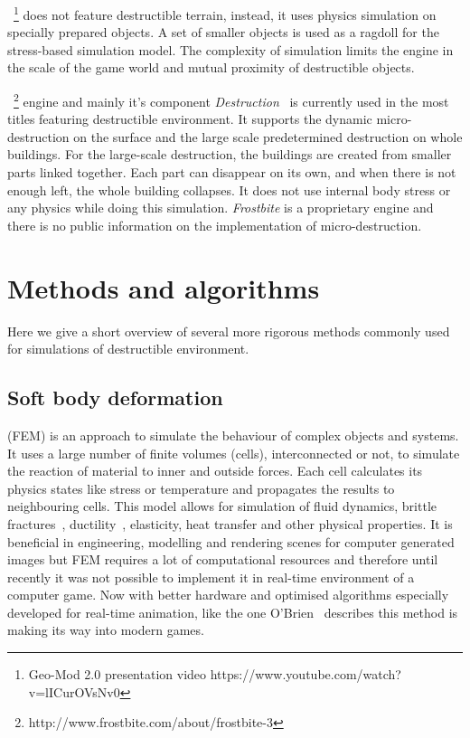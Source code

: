 ~\cite{geomod}\footnote{Geo-Mod 2.0 presentation video https://www.youtube.com/watch?v=lICurOVsNv0} does not feature destructible terrain, instead, it uses physics simulation on specially prepared objects. A set of smaller objects is used as a ragdoll for the stress-based simulation model. The complexity of simulation limits the engine in the scale of the game world and mutual proximity of destructible objects.


~\footnote{http://www.frostbite.com/about/frostbite-3} engine and mainly it's component \emph{Destruction}~\cite{destruction} is currently used in the most titles featuring destructible environment. It supports the dynamic micro-destruction on the surface and the large scale predetermined destruction on whole buildings. For the large-scale destruction, the buildings are created from smaller parts linked together. Each part can disappear on its own, and when there is not enough left, the whole building collapses. It does not use internal body stress or any physics while doing this simulation. \emph{Frostbite} is a proprietary engine and there is no public information on the implementation of micro-destruction.

\section{Methods and algorithms}

Here we give a short overview of several more rigorous methods commonly used for simulations of destructible environment.

\subsection{Soft body deformation}


\label{sec:softBody}

 (FEM) is an approach to simulate the behaviour of complex objects and systems. It uses a large number of finite volumes (cells), interconnected or not, to simulate the reaction of material to inner and outside forces. Each cell calculates its physics states like stress or temperature and propagates the results to neighbouring cells. This model allows for simulation of fluid dynamics, brittle fractures~\cite{brittlefracture}, ductility~\cite{ductilefracture}, elasticity, heat transfer and other physical properties. It is beneficial in engineering, modelling and rendering scenes for computer generated images but FEM requires a lot of computational resources and therefore until recently it was not possible to implement it in real-time environment of a computer game. Now with better hardware and optimised algorithms especially developed for real-time animation, like the one O'Brien~\cite{femingames} describes this method is making its way into modern games.

